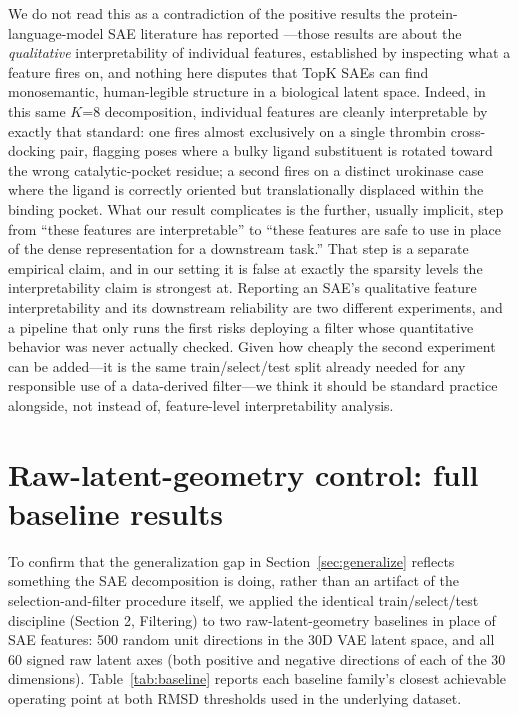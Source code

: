 \documentclass{article}
\begin{document}
We do not read this as a contradiction of the positive results the protein-language-model SAE literature has reported \citep{adams2025,simon2025,zarzecki2025,parsan2025,yu2026}---those results are about the \emph{qualitative} interpretability of individual features, established by inspecting what a feature fires on, and nothing here disputes that TopK SAEs can find monosemantic, human-legible structure in a biological latent space. Indeed, in this same $K$=8 decomposition, individual features are cleanly interpretable by exactly that standard: one fires almost exclusively on a single thrombin cross-docking pair, flagging poses where a bulky ligand substituent is rotated toward the wrong catalytic-pocket residue; a second fires on a distinct urokinase case where the ligand is correctly oriented but translationally displaced within the binding pocket. What our result complicates is the further, usually implicit, step from ``these features are interpretable'' to ``these features are safe to use in place of the dense representation for a downstream task.'' That step is a separate empirical claim, and in our setting it is false at exactly the sparsity levels the interpretability claim is strongest at. Reporting an SAE's qualitative feature interpretability and its downstream reliability are two different experiments, and a pipeline that only runs the first risks deploying a filter whose quantitative behavior was never actually checked. Given how cheaply the second experiment can be added---it is the same train/select/test split already needed for any responsible use of a data-derived filter---we think it should be standard practice alongside, not instead of, feature-level interpretability analysis.




\appendix

\section{Raw-latent-geometry control: full baseline results}
\label{app:baseline}

To confirm that the generalization gap in Section~\ref{sec:generalize} reflects something the SAE decomposition is doing, rather than an artifact of the selection-and-filter procedure itself, we applied the identical train/select/test discipline (Section 2, Filtering) to two raw-latent-geometry baselines in place of SAE features: 500 random unit directions in the 30D VAE latent space, and all 60 signed raw latent axes (both positive and negative directions of each of the 30 dimensions). Table~\ref{tab:baseline} reports each baseline family's closest achievable operating point at both RMSD thresholds used in the underlying dataset.
\end{document}
